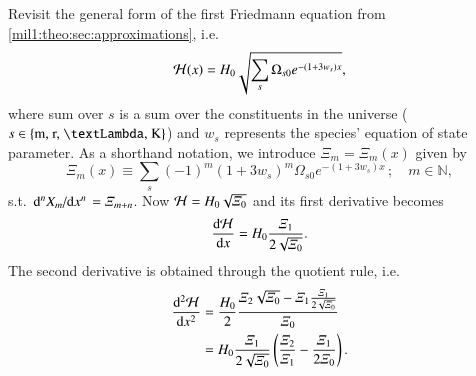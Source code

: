 




Revisit the general form of the first Friedmann equation from \cref{mil1:theo:sec:approximations}, i.e.
\begin{equation}\label{app:hubble_derivatives:eq:Hp_of_x}
    \mathcal{H}(x) = H_0 \sqrt{\sum_{s}\Omega_{s0}e^{-(1+3w_s)x}},
\end{equation}
where sum over $s$ is a sum over the constituents in the universe ($s\in\left\{\text{m, r, \textLambda, K} \right\}$) and $w_s$ represents the species' equation of state parameter. As a shorthand notation, we introduce $\varXi_m = \varXi_m(x)$ given by
\begin{equation}\label{app:hubble_derivatives:eq:Xi_of_x}
    \varXi_{m}(x)\equiv \sum_{s} (-1)^m(1+3w_s)^m \Omega_{s0}e^{-(1+3w_s)x} \,; \quad m\in\mathbb{N},
\end{equation}
s.t. $\dv*[n]{X_m}{x} = \varXi_{m+n}$. Now $\mathcal{H} = H_0\sqrt{\varXi_0}$ and its first derivative becomes
\begin{equation}\label{app:hubble_derivatives:eq:dHp_dx}
    \dv{\mathcal{H}}{x} = H_0 \frac{\varXi_1}{2\sqrt{\varXi_0}}.
\end{equation}
The second derivative is obtained through the quotient rule, i.e.
\begin{equation}\label{app:hubble_derivatives:eq:ddHp_dxx}
    \begin{split}
    \dv[2]{\mathcal{H}}{x} &= \frac{H_0}{2} \frac{\varXi_2\sqrt{\varXi_0} - \varXi_1\frac{\varXi_1}{2\sqrt{\varXi_0}}}{\varXi_0} \\
    &= H_0\frac{\varXi_1} {2\sqrt{\varXi_0}}\left(  \frac{\varXi_2}{\varXi_1}- \frac{\varXi_1}{2\varXi_0} \right).
    \end{split}
\end{equation}


